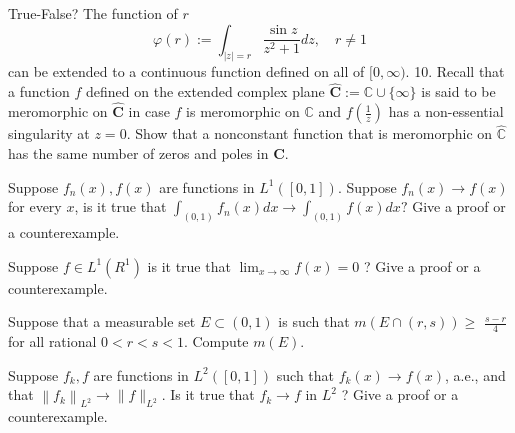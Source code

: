 \documentclass[14pt]{extarticle}
\begin{document}
True-False? The function of $r$
$$
\varphi(r):=\int_{|z|=r} \frac{\sin z}{z^{2}+1} d z, \quad r \neq 1
$$
can be extended to a continuous function defined on all of $[0, \infty)$.
\newpage
10. Recall that a function $f$ defined on the extended complex plane $\widehat{\mathbf{C}}:=\mathbb{C} \cup\{\infty\}$ is said to be meromorphic on $\widehat{\mathbf{C}}$ in case $f$ is meromorphic on $\mathbb{C}$ and $f\left(\frac{1}{z}\right)$ has a non-essential singularity at $z=0$. Show that a nonconstant function that is meromorphic on $\widehat{\mathbb{C}}$ has the same number of zeros and poles in $\widehat{\mathbf{C}}$.
\newpage

Suppose $f_{n}(x), f(x)$ are functions in $L^{1}([0,1])$. Suppose $f_{n}(x) \rightarrow f(x)$ for every $x$, is it true that $\int_{(0,1)} f_{n}(x) d x \rightarrow \int_{(0,1)} f(x) d x ?$ Give a proof or a counterexample.
\newpage

Suppose $f \in L^{1}\left(R^{1}\right)$ is it true that $\lim _{x \rightarrow \infty} f(x)=0$ ? Give a proof or a counterexample.
\newpage

Suppose that a measurable set $E \subset(0,1)$ is such that $m(E \cap(r, s)) \geq$ $\frac{s-r}{4}$ for all rational $0<r<s<1$. Compute $m(E)$.
\newpage

Suppose $f_{k}, f$ are functions in $L^{2}([0,1])$ such that $f_{k}(x) \rightarrow f(x)$, a.e., and that $\left\|f_{k}\right\|_{L^{2}} \rightarrow\|f\|_{L^{2}}$. Is it true that $f_{k} \rightarrow f$ in $L^{2}$ ? Give a proof or a counterexample.
\newpage
\end{document}
